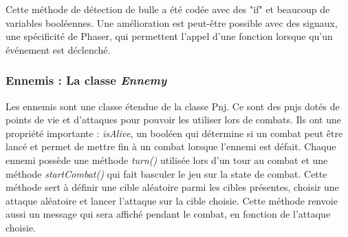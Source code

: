 \documentclass[11pt]{article}
\begin{document}
\begin{appendices}
Cette méthode de détection de bulle a été codée avec des "if" et beaucoup de variables booléennes. Une amélioration est peut-être possible avec des signaux, une spécificité de Phaser, qui permettent l'appel d'une fonction lorsque qu'un événement est déclenché.\subsubsection{Ennemis : La classe \textit{Ennemy}}
Les ennemis sont une classe étendue de la classe Pnj. Ce sont des pnjs dotés de points de vie et d'attaques pour pouvoir les utiliser lors de combats. Ils ont une propriété importante : \textit{isAlive}, un booléen qui détermine si un combat peut être lancé et permet de mettre fin à un combat lorsque l'ennemi est défait. Chaque ennemi possède une méthode \textit{turn()} utilisée lors d'un tour au combat et une méthode \textit{startCombat()} qui fait basculer le jeu sur la state de combat. Cette méthode sert à définir une cible aléatoire parmi les cibles présentes, choisir une attaque aléatoire et lancer l'attaque sur la cible choisie. Cette méthode renvoie aussi un message qui sera affiché pendant le combat, en fonction de l'attaque choisie.

\end{appendices}
\end{document}
